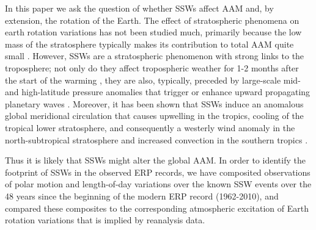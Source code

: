 \documentclass[draft,jgrga]{agutex}
\begin{document}
\begin{article}
In this paper we ask the question of whether SSWs affect AAM and, by extension, the rotation of the Earth.
The effect of stratospheric phenomena on earth rotation variations has not been studied  {much}, primarily because the low mass of the stratosphere typically makes its contribution to total AAM quite small \citep{rosensalstein1985, zhouetal2008}.
However, SSWs are a stratospheric phenomenon with strong links to the troposphere; not only do they affect tropospheric weather for 1-2 months after the start of the warming \citep{baldwindunkerton2001,thompsonetal2002, woollingsetal2010}, they are also, typically, preceded by large-scale  {mid- and high-latitude} pressure anomalies that trigger or enhance upward propagating planetary waves \citep{quiroz1986,martiusetal2009, woollingsetal2010, Garfinkel2010, ayarzaguenaetal2011}.
Moreover, it has been shown that SSWs induce an anomalous global meridional circulation that causes upwelling in the tropics, cooling of the tropical lower stratosphere, and consequently a westerly wind anomaly in the north-subtropical stratosphere \citep{kodera2006} and increased convection in the southern tropics \citep{koderaetal2011}.

Thus it is likely that SSWs might alter the global AAM.
In order to identify the footprint of SSWs in the observed ERP records, we have composited observations of polar motion and length-of-day variations over the known SSW events over the 48 years since the beginning of the modern ERP record (1962-2010), and compared these composites to the corresponding atmospheric excitation of Earth rotation variations that is implied by reanalysis data. 



\end{article}
\end{document}
